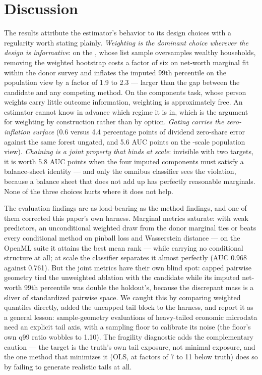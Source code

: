 \section{Discussion}
\label{imp:sec:discussion}

The results attribute the estimator's behavior to its design choices with a
regularity worth stating plainly. \emph{Weighting is the dominant choice
wherever the design is informative}: on the \scf{}, whose list sample
oversamples wealthy households, removing the weighted bootstrap costs a
factor of six on net-worth marginal fit within the donor survey and inflates
the imputed 99th percentile on the population view by a factor of 1.9 to 2.3
--- larger than the gap between the candidate and any competing method. On
the \cps{} components task, whose person weights carry little outcome
information, weighting is approximately free. An estimator cannot know in
advance which regime it is in, which is the argument for weighting by
construction rather than by option. \emph{Gating carries the zero-inflation
surface} (0.6 versus 4.4 percentage points of dividend zero-share error
against the same forest ungated, and 5.6 AUC points on the \populace{}-scale
population view). \emph{Chaining is a joint property that binds at scale}:
invisible with two targets, it is worth 5.8 AUC points when the four imputed
components must satisfy a balance-sheet identity --- and only the omnibus
classifier sees the violation, because a balance sheet that does not add up
has perfectly reasonable marginals. None of the three choices hurts where it
does not help.

The evaluation findings are as load-bearing as the method findings, and one
of them corrected this paper's own harness. Marginal metrics saturate: with
weak predictors, an unconditional weighted draw from the donor marginal ties
or beats every conditional method on pinball loss and Wasserstein distance
--- on the OpenML suite it attains the best mean rank --- while carrying no
conditional structure at all; at \populace{} scale the classifier separates it
almost perfectly (AUC 0.968 against 0.761). But the joint metrics have their
own blind spot: capped pairwise geometry tied the unweighted ablation with
the candidate while its imputed net-worth 99th percentile was double the
holdout's, because the discrepant mass is a sliver of standardized pairwise
space. We caught this by comparing weighted quantiles directly, added the
uncapped tail block to the harness, and report it as a general lesson:
sample-geometry evaluations of heavy-tailed economic microdata need an
explicit tail axis, with a sampling floor to calibrate its noise (the floor's
own q99 ratio wobbles to 1.10). The fragility diagnostic adds the
complementary caution --- the target is the truth's own tail exposure, not
minimal exposure, and the one method that minimizes it (OLS, at factors of 7
to 11 below truth) does so by failing to generate realistic tails at all.

